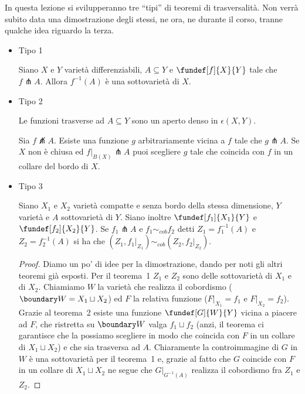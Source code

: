 
In questa lezione si svilupperanno tre ``tipi'' di teoremi di trasversalità. Non verrà subito data una dimostrazione degli stessi, ne ora, ne durante il corso, tranne qualche idea riguardo la terza.

\begin{itemize}
\item Tipo 1 %
\begin{teo}[Teorema 1]
Siano $X$ e $Y$ varietà differenziabili, $A\subseteq Y$ e $\fundef[f]{X}{Y}$  tale che $f\pitchfork A$. Allora $f^{-1}(A)$ è una sottovarietà di $X$.
\end{teo}
\item Tipo 2 %
\begin{teo}[Teorema 2]
Le funzioni trasverse ad $A\subseteq Y$ sono un aperto denso in $\epsilon(X, Y)$. 
\end{teo}
\begin{teo}[Teorema 2++] %
Sia $f \not\pitchfork A$. Esiste una funzione $g$ arbitrariamente vicina a $f$ tale che $g\pitchfork A$. Se $X$ non è chiusa ed $f|_{B(X)} \pitchfork A$ puoi scegliere $g$ tale che coincida con $f$ in un collare del bordo di $X$. 
\end{teo}
\item Tipo 3 %
\begin{teo}[Teorema 3]
Siano $X_1$ e $X_2$ varietà compatte e senza bordo della stessa dimensione, $Y$ varietà e $A$ sottovarietà di $Y$. Siano inoltre $\fundef[f_1]{X_1}{Y}$ e $\fundef[f_2]{X_2}{Y}$. Se $f_1 \pitchfork A$ e $f_1 \sim_{cob} f_2$ detti $Z_1=f_1^{-1}(A)$ e $Z_2=f_2^{-1}(A)$ si ha che $(Z_1, f_1|_{Z_1}) \sim_{cob} (Z_2,f_2|_{Z_2})$. 
\end{teo}
\begin{proof}
 Diamo un po' di idee per la dimostrazione, dando per noti gli altri teoremi già esposti. Per il teorema~1 $Z_1$ e $Z_2$ sono delle sottovarietà di $X_1$ e di $X_2$. Chiamiamo $W$ la varietà che realizza il cobordismo ($\boundary W = X_1 \sqcup X_2$) ed $F$ la relativa funzione ($F|_{X_1} = f_1$ e $F|_{X_2}=f_2$). Grazie al teorema~2 esiste una funzione $\fundef[G]{W}{Y}$ vicina a piacere ad $F$, che ristretta su $\boundary W$ valga $f_1\sqcup f_2$ (anzi, il teorema ci garantisce che la possiamo scegliere in modo che coincida con $F$ in un collare di $X_1\sqcup X_2$) e che sia trasversa ad $A$. Chiaramente la controimmagine di $G$ in $W$ è una sottovarietà per il teorema~1 e, grazie al fatto che $G$ coincide con $F$ in un collare di $X_1 \sqcup X_2$ ne segue che $G|_{G^{-1}(A)}$ realizza il cobordismo fra $Z_1$ e $Z_2$.
 \end{proof}
\end{itemize}

